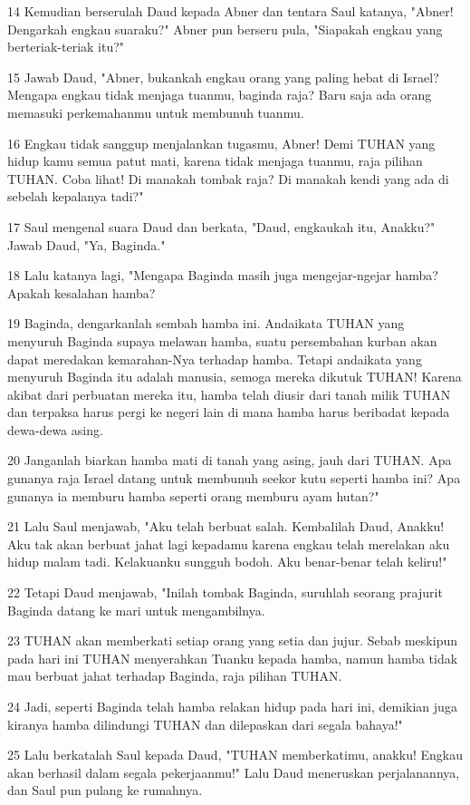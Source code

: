 \par 14 Kemudian berserulah Daud kepada Abner dan tentara Saul katanya, "Abner! Dengarkah engkau suaraku?" Abner pun berseru pula, "Siapakah engkau yang berteriak-teriak itu?"
\par 15 Jawab Daud, "Abner, bukankah engkau orang yang paling hebat di Israel? Mengapa engkau tidak menjaga tuanmu, baginda raja? Baru saja ada orang memasuki perkemahanmu untuk membunuh tuanmu.
\par 16 Engkau tidak sanggup menjalankan tugasmu, Abner! Demi TUHAN yang hidup kamu semua patut mati, karena tidak menjaga tuanmu, raja pilihan TUHAN. Coba lihat! Di manakah tombak raja? Di manakah kendi yang ada di sebelah kepalanya tadi?"
\par 17 Saul mengenal suara Daud dan berkata, "Daud, engkaukah itu, Anakku?" Jawab Daud, "Ya, Baginda."
\par 18 Lalu katanya lagi, "Mengapa Baginda masih juga mengejar-ngejar hamba? Apakah kesalahan hamba?
\par 19 Baginda, dengarkanlah sembah hamba ini. Andaikata TUHAN yang menyuruh Baginda supaya melawan hamba, suatu persembahan kurban akan dapat meredakan kemarahan-Nya terhadap hamba. Tetapi andaikata yang menyuruh Baginda itu adalah manusia, semoga mereka dikutuk TUHAN! Karena akibat dari perbuatan mereka itu, hamba telah diusir dari tanah milik TUHAN dan terpaksa harus pergi ke negeri lain di mana hamba harus beribadat kepada dewa-dewa asing.
\par 20 Janganlah biarkan hamba mati di tanah yang asing, jauh dari TUHAN. Apa gunanya raja Israel datang untuk membunuh seekor kutu seperti hamba ini? Apa gunanya ia memburu hamba seperti orang memburu ayam hutan?"
\par 21 Lalu Saul menjawab, "Aku telah berbuat salah. Kembalilah Daud, Anakku! Aku tak akan berbuat jahat lagi kepadamu karena engkau telah merelakan aku hidup malam tadi. Kelakuanku sungguh bodoh. Aku benar-benar telah keliru!"
\par 22 Tetapi Daud menjawab, "Inilah tombak Baginda, suruhlah seorang prajurit Baginda datang ke mari untuk mengambilnya.
\par 23 TUHAN akan memberkati setiap orang yang setia dan jujur. Sebab meskipun pada hari ini TUHAN menyerahkan Tuanku kepada hamba, namun hamba tidak mau berbuat jahat terhadap Baginda, raja pilihan TUHAN.
\par 24 Jadi, seperti Baginda telah hamba relakan hidup pada hari ini, demikian juga kiranya hamba dilindungi TUHAN dan dilepaskan dari segala bahaya!"
\par 25 Lalu berkatalah Saul kepada Daud, "TUHAN memberkatimu, anakku! Engkau akan berhasil dalam segala pekerjaanmu!" Lalu Daud meneruskan perjalanannya, dan Saul pun pulang ke rumahnya.

